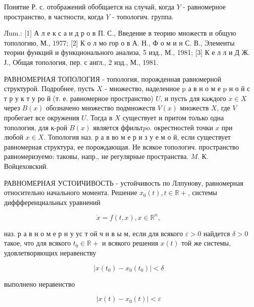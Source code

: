 \documentclass[10pt]{article}
\begin{document}
Понятие Р. с. отображений обобщается на случай, когда $Y$ - равномерное пространство, в частности, когда $Y$ - топологич. группа.



Лum.: [1] А л е к с а н д р о в П. С., Введение в теорию множеств и общую топологию, М., 1977; [2] К о л мо гор о в А. Н., Ф о м и н С. В., Элементы теории функций и функционального анализа, 5 изд., М., 1981; [3] К е л л и Д Ж. Ј., Общая топология, пер. с англ., 2 изд., М., 1981.



РАВНОМЕРНАЯ ТОПОЛОГИЯ - топология, порожденная равномерной структурой. Подробнее, пусть $X$ - множество, наделенное $\mathrm{p}$ а в н о м е $\mathrm{p}$ н о й с т р у к т у ро й (т. е. равномерное пространство) $U$, и пусть для каждого $x \in X$ через $B(x)$ обозначено множество подмножеств $V(x)$ множеств $X$, где $V$ пробегает все окружения $U$. Тогда в $X$ существует и притом только одна топология, для к-рой $B(x)$ является ффильт$p o$. окрестностей точки $x$ при любой $x \in X$. Топология наз. р а в во м е р и з у е м о й, если существует равномерная структура, ее порождающая. Не всякое топологич. пространство равномеризуемо: таковы, напр., не регулярные пространства. $M$. К. Войцеховский.



РАВНОМЕРНАЯ УСТОИЧИВОСТЬ - устойчивость по Ллпунову, равномерная относительно начального момента. Решение $x_{0}(t), t \in \mathbb{R}+$, системы диффференциальных уравнений



\[

\dot{x}=f(t, x), x \in \mathbb{R}^{n},

\]



наз. р а в н о м е р н у ус т ой ч и в ы м, если для всякого $\varepsilon>0$ найдется $\delta>0$ такое, что для всякого $t_{0} \in \mathbb{R}+$ и всякого решения $x(t)$ той же системы, удовлетворяющих неравенству



\[

\left|x\left(t_{0}\right)-x_{0}\left(t_{0}\right)\right|<\delta

\]



выполнено неравенство



\[

\left|x(t)-x_{0}(t)\right|<\varepsilon

\]
\end{document}
